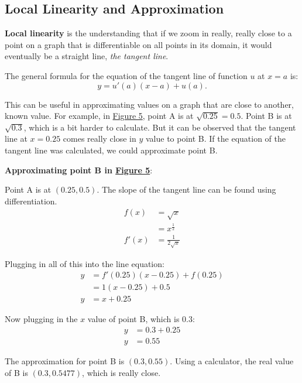 \documentclass[12pt]{article}
\begin{document}
\subsection{Local Linearity and Approximation}
\textbf{Local linearity} is the understanding that if we zoom in really, really close to a point on a graph that is differentiable on all points in its domain, it would eventually be a straight line, \textit{the tangent line}.

\noindent The general formula for the equation of the tangent line of function $u$ at $x=a$ is:
\[ y=u'(a)(x-a) + u(a). \]

This can be useful in approximating values on a graph that are close to another, known value. For example, in \hyperref[fig:locallinapprox]{Figure 5}, point A is at $\sqrt{0.25} = 0.5$. Point B is at $\sqrt{0.3}$, which is a bit harder to calculate. But it can be observed that the tangent line at $x=0.25$ comes really close in $y$ value to point B. If the equation of the tangent line was calculated, we could approximate point B.

\noindent \textbf{Approximating point B in \hyperref[fig:locallinapprox]{Figure 5}}:

\noindent Point A is at $(0.25, 0.5)$. The slope of the tangent line can be found using differentiation.
\begin{align*}
	f(x)  & = \sqrt{x}            \\
	& = x^{\frac{1}{2}}     \\
	f'(x) & = \frac{1}{2\sqrt{x}}
\end{align*}

\noindent Plugging in all of this into the line equation:
\begin{align*}
	y & = f'(0.25)(x-0.25) + f(0.25) \\
	& = 1(x-0.25) + 0.5            \\
	y & = x+0.25
\end{align*}

\noindent Now plugging in the $x$ value of point B, which is $0.3$:
\begin{align*}
	y & = 0.3 + 0.25 \\
	y & = 0.55
\end{align*}

The approximation for point B is $(0.3, 0.55)$. Using a calculator, the real value of B is $(0.3, 0.5477)$, which is really close.
\end{document}
